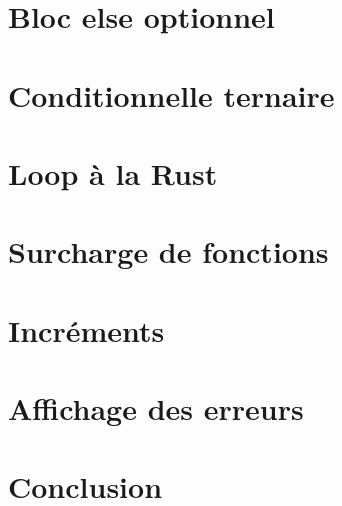 \documentclass[french]{article}
\begin{document}
\section{Bloc else optionnel}

\section{Conditionnelle ternaire}

\section{Loop à la Rust}

\section{Surcharge de fonctions}

\section{Incréments}

\section{Affichage des erreurs}

\section{Conclusion}
\end{document}
